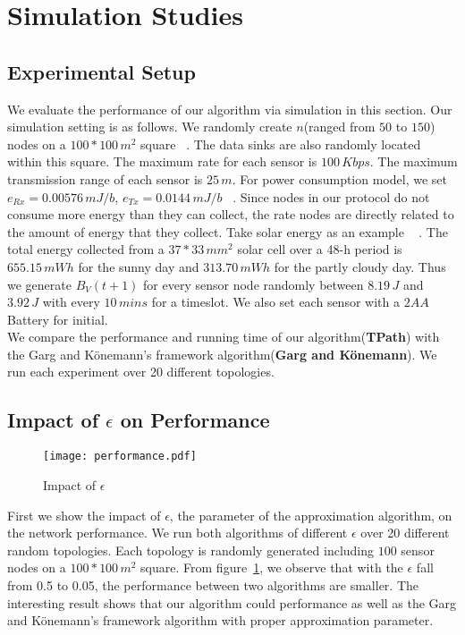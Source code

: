 \documentclass{article}
\begin{document}
\section{Simulation Studies}
\subsection{Experimental Setup}
We evaluate the performance of our algorithm via simulation in this section.
Our simulation setting is as follows. We randomly create $n$(ranged from $50$ to $150$) nodes
on a $100*100\,m^2$ square ~\cite{Maxi}. The data sinks are also randomly located within this square. The maximum rate for each sensor is $100\,Kbps$. The maximum transmission range of each sensor is $25\,m$. For power consumption model, we set $e_{Rx} = 0.00576\,mJ/b$, $e_{Tx} = 0.0144\,mJ/b$ ~\cite{Ene}. Since nodes in our protocol do not 
consume more energy than they can collect, the rate nodes are directly related to the amount of energy that they collect. Take solar energy as an example ~\cite{Ste} . The total energy collected from a $37 * 33\,mm^2$ solar cell over a 48-h period is $655.15\,mWh$ for the sunny day and $313.70\,mWh$ for the partly cloudy day. Thus we generate $B_V(t+1)$ for every sensor node randomly between $8.19\,J$ and $3.92\,J$ with every $10\,mins$ for a timeslot. We also set each sensor with a $2AA$ Battery for initial.\\
We compare the performance and running time of our algorithm(\textbf{TPath}) with the Garg and K\"{o}nemann's framework algorithm(\textbf{Garg and K\"{o}nemann}). We run each experiment over 20 different topologies.

\subsection{Impact of $\epsilon$ on Performance}

\begin{figure}[H]
\centering
\texttt{[image: performance.pdf]} 
\caption{Impact of $\epsilon$}
\label{f1}
\end{figure}

First we show the impact of $\epsilon$, the parameter of the approximation algorithm, on the network performance. We run both algorithms of different $\epsilon$ over 20 different random topologies. Each topology is randomly generated including $100$ sensor nodes on a $100*100\,m^2$ square. From figure~\ref{f1}, we observe that with the $\epsilon$ fall from 0.5 to 0.05, the performance between two algorithms are smaller. The interesting result shows that our algorithm could performance as well as the Garg and K\"{o}nemann's framework algorithm with proper approximation parameter.
\end{document}
